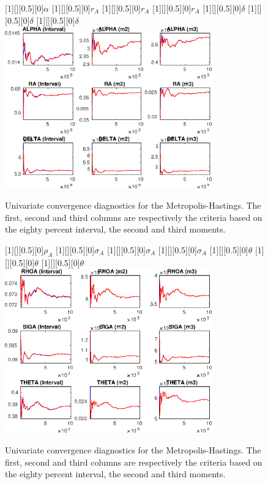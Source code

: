  
\begin{figure}[H]
[1][][0.5][0]{$ {\alpha} $}
[1][][0.5][0]{$ {r_{A}} $}
[1][][0.5][0]{$ {r_{A}} $}
[1][][0.5][0]{$ {r_{A}} $}
[1][][0.5][0]{$ {\delta} $}
[1][][0.5][0]{$ {\delta} $}
[1][][0.5][0]{$ {\delta} $}
\centering 
\includegraphics[width=0.80\textwidth]{KimModTheBuilder/Output/KimModTheBuilder_udiag1}
\caption{Univariate convergence diagnostics for the Metropolis-Hastings.
The first, second and third columns are respectively the criteria based on
the eighty percent interval, the second and third moments.}\label{Fig:UnivariateDiagnostics:1}
\end{figure}

\begin{figure}[H]
[1][][0.5][0]{$ {\rho_A} $}
[1][][0.5][0]{$ {\sigma_A} $}
[1][][0.5][0]{$ {\sigma_A} $}
[1][][0.5][0]{$ {\sigma_A} $}
[1][][0.5][0]{$ {\theta} $}
[1][][0.5][0]{$ {\theta} $}
[1][][0.5][0]{$ {\theta} $}
\centering 
\includegraphics[width=0.80\textwidth]{KimModTheBuilder/Output/KimModTheBuilder_udiag2}
\caption{Univariate convergence diagnostics for the Metropolis-Hastings.
The first, second and third columns are respectively the criteria based on
the eighty percent interval, the second and third moments.}\label{Fig:UnivariateDiagnostics:2}
\end{figure}

